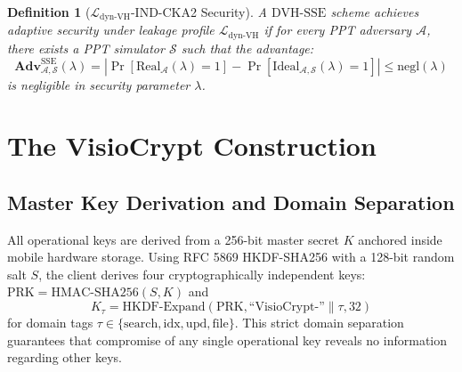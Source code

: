 \documentclass[10pt,conference]{IEEEtran}
\newtheorem{definition}{Definition}
\begin{document}
\begin{definition}[$\mathcal{L}_{\text{dyn-VH}}$-IND-CKA2 Security]
A $\text{DVH-SSE}$ scheme achieves adaptive security under leakage profile $\mathcal{L}_{\text{dyn-VH}}$ if for every PPT adversary $\mathcal{A}$, there exists a PPT simulator $\mathcal{S}$ such that the advantage:
\begin{equation}
\mathbf{Adv}_{\mathcal{A},\mathcal{S}}^{\text{SSE}}(\lambda) = \left| \Pr[\text{Real}_{\mathcal{A}}(\lambda) = 1] - \Pr[\text{Ideal}_{\mathcal{A},\mathcal{S}}(\lambda) = 1] \right| \le \text{negl}(\lambda)
\end{equation}
is negligible in security parameter $\lambda$.
\end{definition}

\section{The VisioCrypt Construction}
\subsection{Master Key Derivation and Domain Separation}
All operational keys are derived from a 256-bit master secret $K$ anchored inside mobile hardware storage. Using RFC 5869 HKDF-SHA256 with a 128-bit random salt $S$, the client derives four cryptographically independent keys: $\text{PRK} = \text{HMAC-SHA256}(S, K)$ and
\begin{equation}
K_{\tau} = \text{HKDF-Expand}(\text{PRK}, \text{``VisioCrypt-''}\parallel \tau, 32)
\end{equation}
for domain tags $\tau \in \{\text{search}, \text{idx}, \text{upd}, \text{file}\}$. This strict domain separation guarantees that compromise of any single operational key reveals no information regarding other keys.
\end{document}
